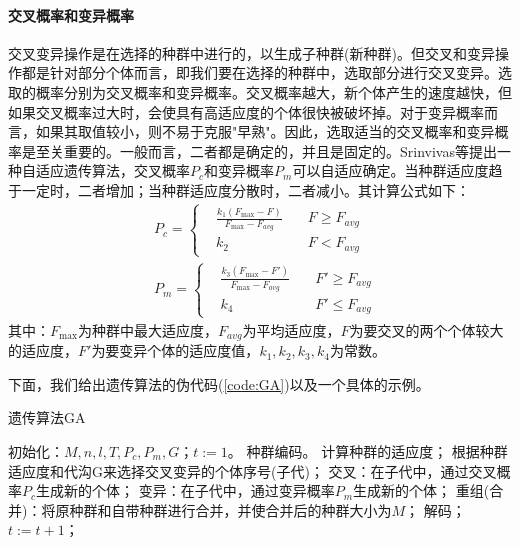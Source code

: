             \paragraph{交叉概率和变异概率}
            交叉变异操作是在选择的种群中进行的，以生成子种群(新种群)。但交叉和变异操作都是针对部分个体而言，即我们要在选择的种群中，选取部分进行交叉变异。选取的概率分别为交叉概率和变异概率。交叉概率越大，新个体产生的速度越快，但如果交叉概率过大时，会使具有高适应度的个体很快被破坏掉。对于变异概率而言，如果其取值较小，则不易于克服"早熟"。因此，选取适当的交叉概率和变异概率是至关重要的。一般而言，二者都是确定的，并且是固定的。Srinvivas等提出一种自适应遗传算法，交叉概率$P_c$和变异概率$P_m$可以自适应确定。当种群适应度趋于一定时，二者增加；当种群适应度分散时，二者减小。其计算公式如下：
            \begin{align*}
            &P_c=\left\{
            \begin{aligned}
            &\frac{k_1(F_{\max}-F)}{F_{\max}-F_{avg}}\quad &F\geqslant F_{avg}\\
            &k_2\quad &F< F_{avg}
            \end{aligned}
            \right.\\
            &P_m=\left\{
            \begin{aligned}
            &\frac{k_3(F_{\max}-F')}{F_{\max}-F_{avg}}\quad &F'\geqslant F_{avg}\\
            &k_4\quad &F' \leqslant F_{avg}
            \end{aligned}
            \right.
            \end{align*}
            其中：$F_{\max}$为种群中最大适应度，$F_{avg}$为平均适应度，$F$为要交叉的两个个体较大的适应度，$F'$为要变异个体的适应度值，$k_1,k_2,k_3,k_4$为常数。
            \par
            下面，我们给出遗传算法的伪代码(\ref{code:GA})以及一个具体的示例。
            \begin{algorithm}[htbp]
                \caption{遗传算法GA}\label{code:GA}
                \begin{algorithmic}[1]
                    \State 初始化：$M,n,l,T,P_c,P_m,G$；$t:=1$。
                    \State 种群编码。
                        \State 计算种群的适应度；
                        \State 根据种群适应度和代沟G来选择交叉变异的个体序号(子代)；
                        \State 交叉：在子代中，通过交叉概率$P_c$生成新的个体；
                        \State 变异：在子代中，通过变异概率$P_m$生成新的个体；
                        \State 重组(合并)：将原种群和自带种群进行合并，并使合并后的种群大小为$M$；
                        \State 解码；
                        \State $t:=t+1$；
                    \EndWhile
                \end{algorithmic}
            \end{algorithm}
